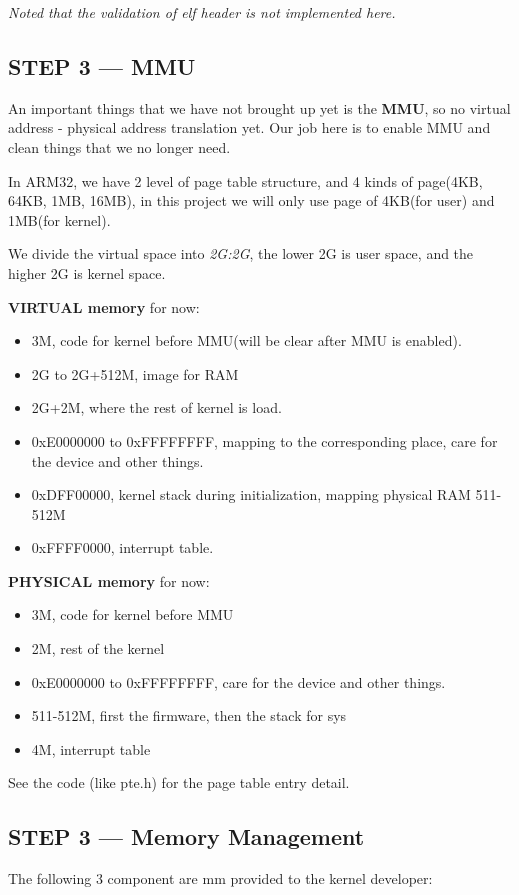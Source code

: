 \documentclass[12pt]{article}
\begin{document}
\emph{Noted that the validation of elf header is not implemented here.}

\subsection{STEP 3 --- MMU}

An important things that we have not brought up yet is the \textbf{MMU}, so no virtual address - physical address translation yet. Our job here is to enable MMU and clean things that we no longer need.

In ARM32, we have 2 level of page table structure, and 4 kinds of page(4KB, 64KB, 1MB, 16MB), in this project we will only use page of 4KB(for user) and 1MB(for kernel).

We divide the virtual space into \emph{2G:2G}, the lower 2G is user space, and the higher 2G is kernel space.

\textbf{VIRTUAL memory} for now:
\begin{itemize}
	\item 3M, code for kernel before MMU(will be clear after MMU is enabled).
	\item	2G to 2G+512M, image for RAM
	\item	2G+2M, where the rest of kernel is load.
	\item	0xE0000000 to 0xFFFFFFFF, mapping to the corresponding place, care for the device and other things.
	\item	0xDFF00000, kernel stack during initialization, mapping physical RAM 511-512M
	\item	0xFFFF0000, interrupt table.
\end{itemize}

\textbf{PHYSICAL memory} for now:
\begin{itemize}
	\item 3M, code for kernel before MMU
	\item	2M, rest of the kernel
	\item	0xE0000000 to 0xFFFFFFFF, care for the device and other things.
	\item	511-512M, first the firmware, then the stack for sys
	\item	4M, interrupt table
\end{itemize}

See the code (like pte.h) for the page table entry detail.

\subsection{STEP 3 --- Memory Management}
The following 3 component are mm provided to the kernel developer:
\end{document}
